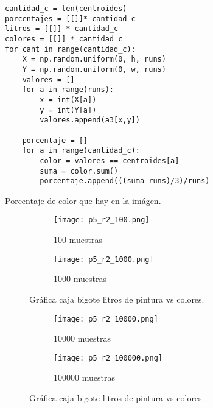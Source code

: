 \documentclass{article}
\begin{document}
\renewcommand{\listingscaption}{Código}
\begin{listing}[H]
  \begin{verbatim}
cantidad_c = len(centroides)
porcentajes = [[]]* cantidad_c
litros = [[]] * cantidad_c
colores = [[]] * cantidad_c
for cant in range(cantidad_c):
    X = np.random.uniform(0, h, runs)
    Y = np.random.uniform(0, w, runs) 
    valores = []
    for a in range(runs):
        x = int(X[a])
        y = int(Y[a])
        valores.append(a3[x,y])
       
    porcentaje = []
    for a in range(cantidad_c):
        color = valores == centroides[a]
        suma = color.sum()
        porcentaje.append(((suma-runs)/3)/runs)
        \end{verbatim}
  \label{lst:fibo}
  \caption{Porcentaje de color que hay en la imágen.}
\end{listing}

\begin{figure}[H]
\centering
\begin{subfigure}[b]{0.40\linewidth}
\texttt{[image: p5\_r2\_100.png]}
\caption{100 muestras }
\end{subfigure}
\begin{subfigure}[b]{0.40\linewidth}
\texttt{[image: p5\_r2\_1000.png]}
\caption{1000 muestras}
\end{subfigure}
\caption{Gráfica caja bigote litros de pintura vs colores.}
\label{fig:westminster}
\end{figure}

\begin{figure}[H]
\centering
\begin{subfigure}[b]{0.40\linewidth}
\texttt{[image: p5\_r2\_10000.png]}
\caption{10000 muestras }
\end{subfigure}
\begin{subfigure}[b]{0.40\linewidth}
\texttt{[image: p5\_r2\_100000.png]}
\caption{100000 muestras}
\end{subfigure}
\caption{Gráfica caja bigote litros de pintura vs colores.}
\label{fig:westminster}
\end{figure}
\printbibliography
\end{document}
